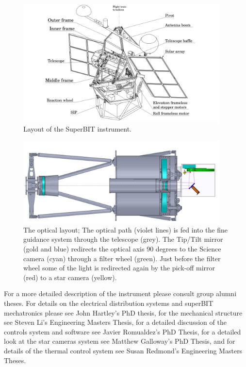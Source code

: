 \begin{figure}
    \begin{small}
        \begin{center}
            \includegraphics[width=0.95\textwidth]{Introduction/figs/bit_model.png}
        \end{center}
        \caption{Layout of the SuperBIT instrument.}
        \label{fig:bit}
    \end{small}
\end{figure}

\begin{figure}
    \begin{small}
        \begin{center}
            \includegraphics[width=0.95\textwidth]{Introduction/figs/optical_path.png}
        \end{center}
        \caption{The optical layout; The optical path (violet lines) is fed into the fine guidance system through the telescope (grey). The Tip/Tilt mirror (gold and blue) redirects the optical axis 90 degrees to the Science camera (cyan) through a filter wheel (green). Just before the filter wheel some of the light is redirected again by the pick-off mirror (red) to a star camera (yellow).}
        \label{fig:optics}
    \end{small}
\end{figure}

\par
For a more detailed description of the instrument please consult group alumni theses. For details on the electrical distribution systems and
superBIT mechatronics please see John Hartley's PhD thesis, for the mechanical structure see Steven Li’s Engineering Masters Thesis, for a detailed discussion of the controls system and software see Javier Romualdez’s PhD Thesis, for a detailed look at the star cameras system see Matthew Galloway’s PhD Thesis, and for details of the thermal control system see Susan Redmond’s Engineering Masters Theses.

